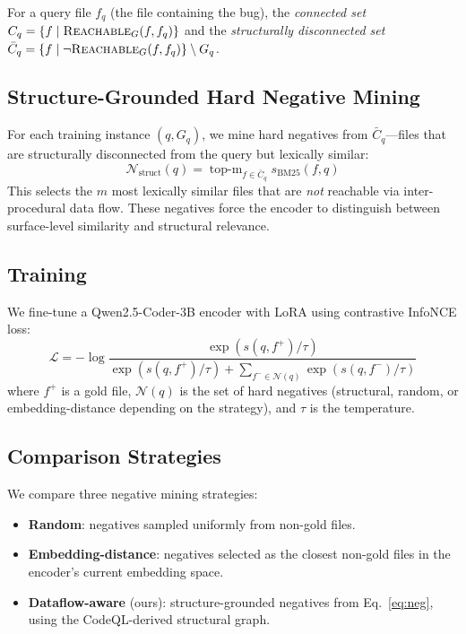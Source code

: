 \documentclass[11pt]{article}
\begin{document}
For a query file $f_q$ (the file containing the bug), the \emph{connected set} $C_q = \{f \mid \textsc{Reachable}_G(f, f_q)\}$ and the \emph{structurally disconnected set} $\bar{C}_q = \{f \mid \neg\textsc{Reachable}_G(f, f_q)\} \setminus G_q$.

\subsection{Structure-Grounded Hard Negative Mining}

For each training instance $(q, G_q)$, we mine hard negatives from $\bar{C}_q$---files that are structurally disconnected from the query but lexically similar:
\begin{equation}
  \mathcal{N}_{\text{struct}}(q) = \operatorname{top\text{-}m}_{f \in \bar{C}_q} s_{\text{BM25}}(f, q)
\end{equation}
This selects the $m$ most lexically similar files that are \emph{not} reachable via inter-procedural data flow.
These negatives force the encoder to distinguish between surface-level similarity and structural relevance.

\subsection{Training}

We fine-tune a Qwen2.5-Coder-3B encoder with LoRA using contrastive InfoNCE loss:
\begin{equation}
  \mathcal{L} = -\log \frac{\exp(s(q, f^+)/\tau)}{\exp(s(q, f^+)/\tau) + \sum_{f^- \in \mathcal{N}(q)} \exp(s(q, f^-)/\tau)}
\end{equation}
where $f^+$ is a gold file, $\mathcal{N}(q)$ is the set of hard negatives (structural, random, or embedding-distance depending on the strategy), and $\tau$ is the temperature.

\subsection{Comparison Strategies}

We compare three negative mining strategies:
\begin{itemize}[nosep]
  \item \textbf{Random}: negatives sampled uniformly from non-gold files.
  \item \textbf{Embedding-distance}: negatives selected as the closest non-gold files in the encoder's current embedding space.
  \item \textbf{Dataflow-aware} (ours): structure-grounded negatives from Eq.~\ref{eq:neg}, using the CodeQL-derived structural graph.
\end{itemize}
\end{document}
